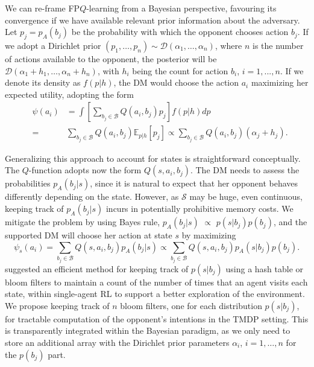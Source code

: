 We can re-frame FP$Q$-learning from a Bayesian perspective,
favouring its convergence if we have available relevant  
prior information about the adversary. %
Let $p_j = p_A(b_j)$ be the probability with which
the opponent chooses action $b_j$. 
If we adopt a Dirichlet prior
$(p_1 , \ldots, p_n) \sim \mathcal{D}(\alpha_1,\ldots,\alpha_n)$,
where $n$ is the number of actions available to the opponent, 
the posterior will be  
$\mathcal{D}(\alpha_1 + h_1,\ldots,\alpha_n + h_n)$, with  $h_i$ 
being the count for action $b_i$, $i=1,...,n$. 
If we denote its density as $f(p|h)$, the DM would choose the action $a_i$ maximizing her expected utility,
adopting the form
\begin{eqnarray*}
& \psi(a_i) & = \int \left[\sum_{b_j \in \mathcal{B}}
Q(a_i, b_j) p_j\right] f(p|h) dp \\
&=& \sum_{b_j \in \mathcal{B}} Q(a_i, b_j) \mathbb{E}_{p|h}[p_j]
\propto  \sum_{b_j \in \mathcal{B}} Q(a_i, b_j) (\alpha_j + h_j).
\end{eqnarray*}

Generalizing this approach to account for states is straightforward
conceptually.
The $Q$-function adopts now the form $Q(s, a_i, b_j)$. The DM needs to assess the probabilities $p_A(b_j | s)$,
since it is natural to expect that her opponent behaves differently depending
on the state.
However, as $\mathcal{S}$ may be huge, even continuous, keeping track of $p_A(b_j|s)$ 
incurs in potentially prohibitive memory costs. 
We mitigate the 
problem by using 
Bayes rule, $p_{A}(b_j| s) \,\, \propto \,\, p(s| b_j)p(b_j)$, 
and the supported DM will choose her action at state $s$ by maximizing
\[ \psi_s(a_i) = \sum_{b_j \in \mathcal{B}} Q(s, a_i, b_j) p_{A}(b_j|s)
\propto 
\sum_{b_j \in \mathcal{B}} Q(s, a_i, b_j) p_{A}(s | b_j) p (b_j ).  \]
  \cite{tang2017exploration} suggested an efficient method for keeping track of $p(s| b_j)$ using a hash table or bloom filters to maintain a count of the number of times that an agent visits each state, within single-agent RL to support a better exploration of the environment. We propose keeping 
  track of $n$ bloom filters, one for each
distribution $p(s|b_j)$, for tractable computation of the opponent's intentions
in the TMDP setting. This is transparently integrated
within the Bayesian paradigm, as we only need to store an additional array with the Dirichlet prior parameters $\alpha_i$, $i=1,\ldots, n$ for the $p(b_j)$ part. %

